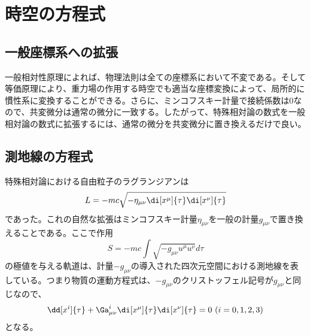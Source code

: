     \section{時空の方程式}
        \subsection{一般座標系への拡張}
            一般相対性原理によれば、物理法則は全ての座標系において不変である。そして等価原理により、重力場の作用する時空でも適当な座標変換によって、局所的に慣性系に変換することができる。さらに、ミンコフスキー計量で接続係数は0なので、共変微分は通常の微分に一致する。したがって、特殊相対論の数式を一般相対論の数式に拡張するには、通常の微分を共変微分に置き換えるだけで良い。
        \subsection{測地線の方程式}
            特殊相対論における自由粒子のラグランジアンは
                \[L = -mc\sqrt{-\eta_{\mu\nu}\di[x^\mu]{\tau}\di[x^\nu]{\tau}}\]
            であった。これの自然な拡張はミンコフスキー計量$\eta_{\mu\nu}$を一般の計量$g_{\mu\nu}$で置き換えることである。ここで作用
                \[S = -mc\int \sqrt{-g_{\mu\nu}u^\mu u^\nu}d\tau\]
            の極値を与える軌道は、計量$-g_{\mu\nu}$の導入された四次元空間における測地線を表している。つまり物質の運動方程式は、$-g_{\mu\nu}$のクリストッフェル記号が$g_{\mu\nu}$と同じなので、
                \[\dd[x^i]{\tau}+\Ga^i_{\mu\nu}\di[x^\mu]{\tau}\di[x^\nu]{\tau} = 0\ (i=0,1,2,3)\]
            となる。

